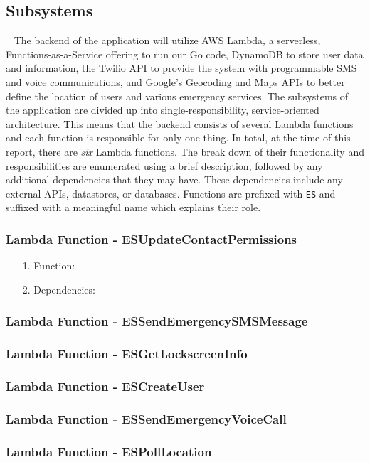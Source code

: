\documentclass[10pt, a4paper]{article}
\begin{document}
\subsection{Subsystems}
\par ~ The backend of the application will utilize AWS Lambda, a serverless, Functions-as-a-Service offering to run our Go code, DynamoDB to store user data and information, the Twilio API to provide the system with programmable SMS and voice communications, and Google's Geocoding and Maps APIs to better define the location of users and various emergency services. The subsystems of the application are divided up into single-responsibility, service-oriented architecture. This means that the backend consists of several Lambda functions and each function is responsible for only one thing. In total, at the time of this report, there are \emph{six} Lambda functions. The break down of their functionality and responsibilities are enumerated using a brief description, followed by any additional dependencies that they may have. These dependencies include any external APIs, datastores, or databases. Functions are prefixed with \texttt{ES} and suffixed with a meaningful name which explains their role.

\subsubsection{Lambda Function - ESUpdateContactPermissions}
\begin{enumerate}
	\item[1.] Function: 
	\item[2.] Dependencies: 
\end{enumerate}
\subsubsection{Lambda Function - ESSendEmergencySMSMessage }
\subsubsection{Lambda Function - ESGetLockscreenInfo }
\subsubsection{Lambda Function - ESCreateUser }
\subsubsection{Lambda Function - ESSendEmergencyVoiceCall }
\subsubsection{Lambda Function - ESPollLocation }
\end{document}
